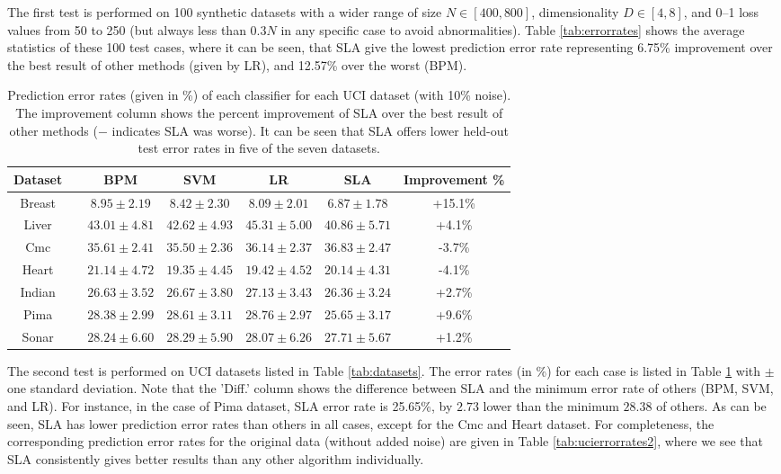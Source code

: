 The first test is performed on 100 synthetic datasets with a wider
range of size $N \in [400, 800]$, dimensionality $D \in [4, 8]$, and
0--1 loss values from 50 to 250 (but always less than $0.3 N$ in any
specific case to avoid abnormalities). Table \ref{tab:errorrates}
shows the average statistics of these 100 test cases, where it can be
seen, that SLA give the lowest prediction error rate representing
6.75\% improvement over the best result of other methods (given by
LR), and 12.57\% over the worst (BPM).

\begin{table}[htbp!]
\centering
{\footnotesize 
\begin{tabular}{|cc|  ccc|c|c|}
\hline\hline
{\bf Dataset} && {\bf BPM} & {\bf SVM} & {\bf LR} & {\bf SLA} & {\bf Improvement \%}\\  
\hline
Breast && $8.95 \pm 2.19$ & $8.42 \pm 2.30$ & $8.09 \pm 2.01$ & $6.87 \pm 1.78$ & +15.1\%\\  
Liver && $43.01 \pm 4.81$ & $42.62 \pm 4.93$ & $45.31 \pm 5.00$ & $40.86 \pm 5.71$ & +4.1\%\\  
Cmc && $35.61 \pm 2.41$ & $35.50 \pm 2.36$ & $36.14 \pm 2.37$ & $36.83 \pm 2.47$ & -3.7\%\\  
Heart && $21.14 \pm 4.72$ & $19.35 \pm 4.45$ & $19.42 \pm 4.52$ & $20.14 \pm 4.31$ & -4.1\%\\  
Indian && $26.63 \pm 3.52$ & $26.67 \pm 3.80$ & $27.13 \pm 3.43$ & $26.36 \pm 3.24$ & +2.7\%\\  
Pima && $28.38 \pm 2.99$ & $28.61 \pm 3.11$ & $28.76 \pm 2.97$ & $25.65 \pm 3.17$ & +9.6\%\\  
Sonar && $28.24 \pm 6.60$ & $28.29 \pm 5.90$ & $28.07 \pm 6.26$ & $27.71 \pm 5.67$ & +1.2\%\\  
\hline
\end{tabular}}
\caption{Prediction error rates (given in \%) of each classifier for
  each UCI dataset (with 10\% noise). The improvement column shows the
  percent improvement of SLA over the best result of other methods ($-$
  indicates SLA was worse). It can be seen that SLA offers lower held-out
  test error rates in five of the seven datasets.}
\label{tab:ucierrorrates}
\end{table}

The second test is performed on UCI datasets listed in Table
\ref{tab:datasets}. The error rates (in \%) for each case is listed in
Table \ref{tab:ucierrorrates} with $\pm$ one standard deviation. Note
that the 'Diff.' column shows the difference between SLA and the
minimum error rate of others (BPM, SVM, and LR). For instance, in the
case of Pima dataset, SLA error rate is 25.65\%, by $2.73$ lower than
the minimum $28.38$ of others. As can be seen, SLA has lower
prediction error rates than others in all cases, except for the Cmc
and Heart dataset. For completeness, the corresponding prediction
error rates for the original data (without added noise) are given in
Table \ref{tab:ucierrorrates2}, where we see that SLA consistently
gives better results than any other algorithm individually. 
